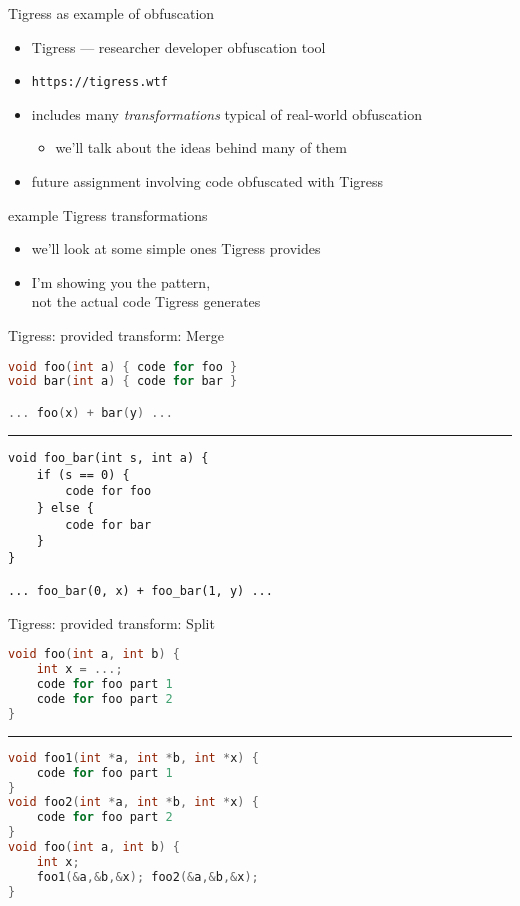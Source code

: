 \begin{frame}{Tigress as example of obfuscation}
    \begin{itemize}
    \item Tigress --- researcher developer obfuscation tool
    \item \texttt{https://tigress.wtf}
    \item includes many \textit{transformations} typical of real-world obfuscation
        \begin{itemize}
        \item we'll talk about the ideas behind many of them
        \end{itemize}
    \vspace{.5cm}
    \item future assignment involving code obfuscated with Tigress
    \end{itemize}
\end{frame}
\begin{frame}{example Tigress transformations}
    \begin{itemize}
    \item we'll look at some simple ones Tigress provides
    \item I'm showing you the pattern, \\ not the actual code Tigress generates
    \end{itemize}
\end{frame}

\begin{frame}[fragile,label=TigressMerge]{Tigress: provided transform: Merge}
\begin{lstlisting}[language=C++,style=smaller]
void foo(int a) { code for foo }
void bar(int a) { code for bar }

... foo(x) + bar(y) ...
\end{lstlisting}
\hrule
\begin{lstlisting}
void foo_bar(int s, int a) {
    if (s == 0) {
        code for foo
    } else {
        code for bar
    }
}

... foo_bar(0, x) + foo_bar(1, y) ...
\end{lstlisting}
\end{frame}

\begin{frame}[fragile,label=TigressSplit]{Tigress: provided transform: Split}
\begin{lstlisting}[language=C++,style=smaller]
void foo(int a, int b) {
    int x = ...;
    code for foo part 1
    code for foo part 2
}
\end{lstlisting}
\hrule
\begin{lstlisting}[language=C++,style=smaller]
void foo1(int *a, int *b, int *x) {
    code for foo part 1
}
void foo2(int *a, int *b, int *x) {
    code for foo part 2
}
void foo(int a, int b) {
    int x;
    foo1(&a,&b,&x); foo2(&a,&b,&x);
}
\end{lstlisting}
\end{frame}

